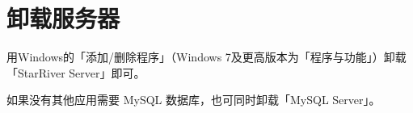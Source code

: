 \section{卸载服务器}\label{ux5378ux8f7dux670dux52a1ux5668}

用Windows的「添加/删除程序」（Windows 7及更高版本为「程序与功能」）卸载
「StarRiver Server」即可。

如果没有其他应用需要 MySQL 数据库，也可同时卸载「MySQL Server」。
